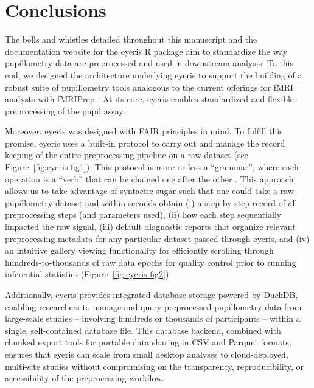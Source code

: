 \section{Conclusions}
The bells and whistles detailed throughout this manuscript and the documentation website for the eyeris R package aim to standardize the way pupillometry data are preprocessed and used in downstream analysis. To this end, we designed the architecture underlying eyeris to support the building of a robust suite of pupillometry tools analogous to the current offerings for fMRI analysts with fMRIPrep \parencite{esteban2020analysis,esteban2019fmriprep}. At its core, eyeris enables standardized and flexible preprocessing of the pupil assay.

Moreover, eyeris was designed with FAIR principles in mind. To fulfill this promise, eyeris uses a built-in protocol to carry out and manage the record keeping of the entire preprocessing pipeline on a raw dataset (see Figure~\ref{fig:eyeris-fig1}). This protocol is more or less a ``grammar'', where each operation is a ``verb'' that can be chained one after the other \parencite[see Box~\ref{box:extensions}, which draws inspiration from familiar tidyverse ``pipe'' workflows;][]{wickham2019welcome}. This approach allows us to take advantage of syntactic sugar such that one could take a raw pupillometry dataset and within seconds obtain (i) a step-by-step record of all preprocessing steps (and parameters used), (ii) how each step sequentially impacted the raw signal, (iii) default diagnostic reports that organize relevant preprocessing metadata for any particular dataset passed through eyeris, and (iv) an intuitive gallery viewing functionality for efficiently scrolling through hundreds-to-thousands of raw data epochs for quality control prior to running inferential statistics (Figure~\ref{fig:eyeris-fig2}).

Additionally, eyeris provides integrated database storage powered by DuckDB, enabling researchers to manage and query preprocessed pupillometry data from large-scale studies – involving hundreds or thousands of participants – within a single, self-contained database file. This database backend, combined with chunked export tools for portable data sharing in CSV and Parquet formats, ensures that eyeris can scale from small desktop analyses to cloud-deployed, multi-site studies without compromising on the transparency, reproducibility, or accessibility of the preprocessing workflow.

